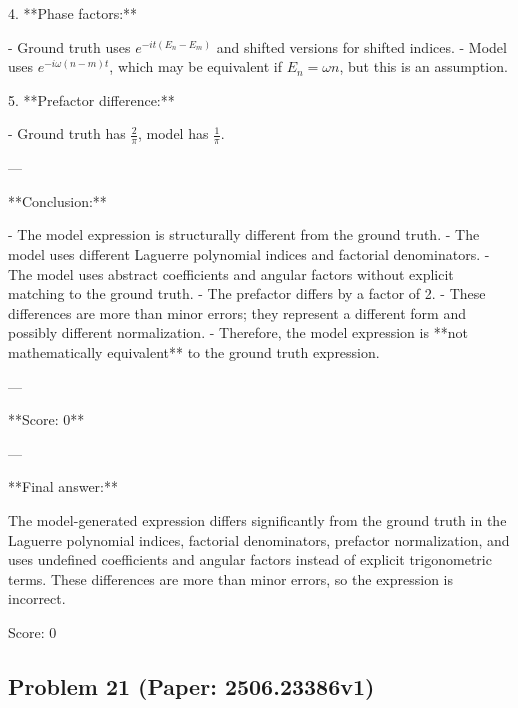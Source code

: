 \documentclass[10pt]{article}
\begin{document}
4. **Phase factors:**

- Ground truth uses $e^{-it(E_n - E_m)}$ and shifted versions for shifted indices.
- Model uses $e^{-i\omega (n - m) t}$, which may be equivalent if $E_n = \omega n$, but this is an assumption.

5. **Prefactor difference:**

- Ground truth has $\frac{2}{\pi}$, model has $\frac{1}{\pi}$.

---

**Conclusion:**

- The model expression is structurally different from the ground truth.
- The model uses different Laguerre polynomial indices and factorial denominators.
- The model uses abstract coefficients and angular factors without explicit matching to the ground truth.
- The prefactor differs by a factor of 2.
- These differences are more than minor errors; they represent a different form and possibly different normalization.
- Therefore, the model expression is **not mathematically equivalent** to the ground truth expression.

---

**Score: 0**

---

**Final answer:**

The model-generated expression differs significantly from the ground truth in the Laguerre polynomial indices, factorial denominators, prefactor normalization, and uses undefined coefficients and angular factors instead of explicit trigonometric terms. These differences are more than minor errors, so the expression is incorrect.

Score: 0

\newpage
\subsection*{Problem 21 (Paper: 2506.23386v1)}
\end{document}
